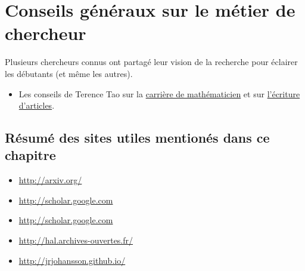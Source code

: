 \section{Conseils généraux sur le métier de chercheur}
Plusieurs chercheurs connus ont partagé leur vision de la recherche
pour éclairer les débutants (et même les autres).
\begin{itemize}
 \item Les conseils de Terence Tao sur la \href{http://terrytao.wordpress.com/career-advice/}{carrière de mathématicien} et sur \href{http://terrytao.wordpress.com/advice-on-writing-papers/}{l'écriture d'articles}.
\end{itemize}




\subsection*{R\'esum\'e des sites utiles mentionés dans ce chapitre}

\begin{itemize}
\item[\color{orange_js}{$\startri$}]
\url{http://arxiv.org/}
 \item[\color{orange_js}{$\startri$}]
\url{http://scholar.google.com}
 \item[\color{orange_js}{$\startri$}]
\url{http://scholar.google.com} \item[\color{orange_js}{$\stardble$}]
\url{http://hal.archives-ouvertes.fr/}
  \item[\color{orange_js}{$\stardble$}]
\url{http://jrjohansson.github.io/}
\end{itemize}
